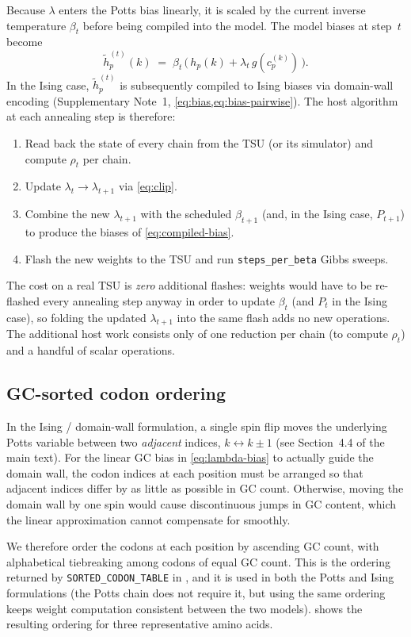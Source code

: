 \documentclass[11pt]{article}
\begin{document}
Because $\lambda$ enters the Potts bias linearly, it is scaled by the current inverse temperature $\beta_t$ before being compiled into the model. The model biases at step~$t$ become
\begin{equation}\label{eq:compiled-bias}
  \tilde h_p^{(t)}(k) \;=\; \beta_t \,\Big(\, h_p(k) + \lambda_t \, g\!\left(c_p^{(k)}\right)\,\Big).
\end{equation}
In the Ising case, $\tilde h_p^{(t)}$ is subsequently compiled to Ising biases via domain-wall encoding (Supplementary Note~1, \cref{eq:bias,eq:bias-pairwise}).
The host algorithm at each annealing step is therefore:
\begin{enumerate}
  \item Read back the state of every chain from the TSU (or its simulator) and compute $\rho_t$ per chain.
  \item Update $\lambda_t \to \lambda_{t+1}$ via \cref{eq:clip}.
  \item Combine the new $\lambda_{t+1}$ with the scheduled $\beta_{t+1}$ (and, in the Ising case, $P_{t+1}$) to produce the biases of \cref{eq:compiled-bias}.
  \item Flash the new weights to the TSU and run \texttt{steps\_per\_beta} Gibbs sweeps.
\end{enumerate}
The cost on a real TSU is \emph{zero} additional flashes: weights would have to be re-flashed every annealing step anyway in order to update $\beta_t$ (and $P_t$ in the Ising case), so folding the updated $\lambda_{t+1}$ into the same flash adds no new operations.
The additional host work consists only of one reduction per chain (to compute $\rho_t$) and a handful of scalar operations.

\subsection*{GC-sorted codon ordering}

In the Ising / domain-wall formulation, a single spin flip moves the underlying Potts variable between two \emph{adjacent} indices, $k \leftrightarrow k{\pm}1$ (see Section~4.4 of the main text).
For the linear GC bias in \cref{eq:lambda-bias} to actually guide the domain wall, the codon indices at each position must be arranged so that adjacent indices differ by as little as possible in GC count.
Otherwise, moving the domain wall by one spin would cause discontinuous jumps in GC content, which the linear approximation cannot compensate for smoothly.

We therefore order the codons at each position by ascending GC count, with alphabetical tiebreaking among codons of equal GC count.
This is the ordering returned by \texttt{SORTED\_CODON\_TABLE} in , and it is used in both the Potts and Ising formulations (the Potts chain does not require it, but using the same ordering keeps weight computation consistent between the two models).
 shows the resulting ordering for three representative amino acids.
\end{document}
